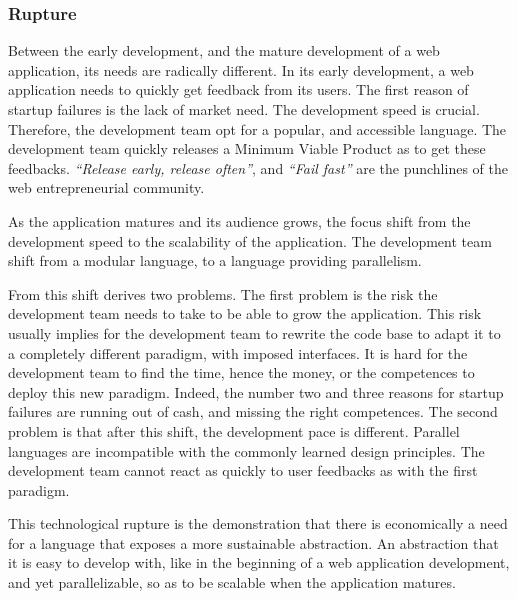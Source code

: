 \subsubsection{Rupture}

Between the early development, and the mature development of a web application, its needs are radically different.
In its early development, a web application needs to quickly get feedback from its users.
The first reason of startup failures is the lack of market need.
The development speed is crucial.
Therefore, the development team opt for a popular, and accessible language.
The development team quickly releases a Minimum Viable Product as to get these feedbacks.
\textit{``Release early, release often''}, and \textit{``Fail fast''} are the punchlines of the web entrepreneurial community.

As the application matures and its audience grows, the focus shift from the development speed to the scalability of the application.
The development team shift from a modular language, to a language providing parallelism.

From this shift derives two problems.
The first problem is the risk the development team needs to take to be able to grow the application.
This risk usually implies for the development team to rewrite the code base to adapt it to a completely different paradigm, with imposed interfaces.
It is hard for the development team to find the time, hence the money, or the competences to deploy this new paradigm.
Indeed, the number two and three reasons for startup failures are running out of cash, and missing the right competences.
The second problem is that after this shift, the development pace is different.
Parallel languages are incompatible with the commonly learned design principles.
The development team cannot react as quickly to user feedbacks as with the first paradigm.



This technological rupture is the demonstration that there is economically a need for a language that exposes a more sustainable abstraction.
An abstraction that it is easy to develop with, like in the beginning of a web application development, and yet parallelizable, so as to be scalable when the application matures.

